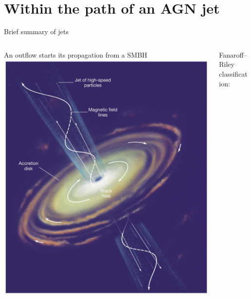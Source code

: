 \section{Within the path of an AGN jet}

\begin{frame}{Brief summary of jets}
 \begin{columns}
  \begin{column}{.5\textwidth}
   An outflow starts its propagation from a SMBH
	\includegraphics[width=\textwidth]{images/central_engine.jpg}
  \end{column}
  \begin{column}{.5\textwidth}
	  Fanaroff–Riley classification:
	  \vspace{0.1cm}
	  \begin{columns}
	   \begin{column}{0.6\textwidth}

\end{column}
\end{columns}
\end{column}
\end{columns}
\end{frame}
